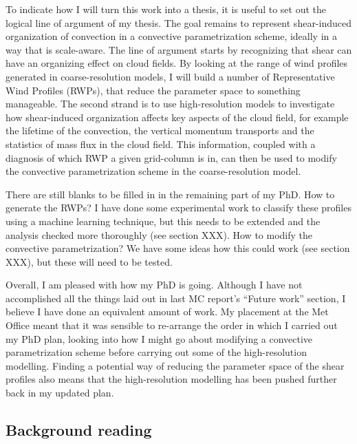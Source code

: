 \documentclass[11pt,a4paper]{article}
\begin{document}
To indicate how I will turn this work into a thesis, it is useful to set out the logical line of argument of my thesis. The goal remains to represent shear-induced organization of convection in a convective parametrization scheme, ideally in a way that is scale-aware. The line of argument starts by recognizing that shear can have an organizing effect on cloud fields. By looking at the range of wind profiles generated in coarse-resolution models, I will build a number of Representative Wind Profiles (RWPs), that reduce the parameter space to something manageable. The second strand is to use high-resolution models to investigate how shear-induced organization affects key aspects of the cloud field, for example the lifetime of the convection, the vertical momentum transports and the statistics of mass flux in the cloud field. This information, coupled with a diagnosis of which RWP a given grid-column is in, can then be used to modify the convective parametrization scheme in the coarse-resolution model.

There are still blanks to be filled in in the remaining part of my PhD. How to generate the RWPs? I have done some experimental work to classify these profiles using a machine learning technique, but this needs to be extended and the analysis checked more thoroughly (see section XXX). How to modify the convective parametrization? We have some ideas how this could work (see section XXX), but these will need to be tested. 

Overall, I am pleased with how my PhD is going. Although I have not accomplished all the things laid out in last MC report's ``Future work'' section, I believe I have done an equivalent amount of work. My placement at the Met Office meant that it was sensible to re-arrange the order in which I carried out my PhD plan, looking into how I might go about modifying a convective parametrization scheme before carrying out some of the high-resolution modelling. Finding a potential way of reducing the parameter space of the shear profiles also means that the high-resolution modelling has been pushed further back in my updated plan. 

\subsection{Background reading}
\label{sec:Background reading}

\end{document}
